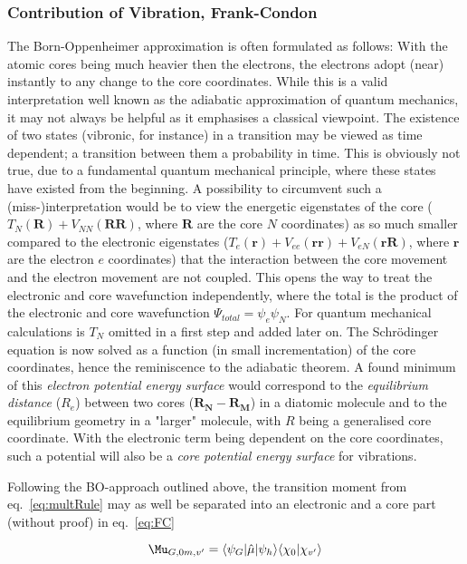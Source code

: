 			\subsubsection{Contribution of Vibration, Frank-Condon}
			The Born-Oppenheimer approximation is often formulated as follows: With the atomic cores being much heavier then the electrons, the electrons adopt (near) instantly to any change to the core coordinates. While this is a valid interpretation well known as the adiabatic approximation of quantum mechanics, it may not always be helpful as it emphasises a classical viewpoint. The existence of two states (vibronic, for instance) in a transition may be viewed as time dependent; a transition between them a probability in time. This is obviously not true, due to a fundamental quantum mechanical principle, where these states have existed from the beginning. A possibility to circumvent such a (miss-)interpretation would be to view the energetic eigenstates of the core ($T_{N}(\bm{R}) + V_{NN}(\bm{RR})$, where $\bm{R}$ are the core $N$ coordinates) as so much smaller compared to the electronic eigenstates ($T_e(\bm{r}) + V_{ee}(\bm{rr}) + V_{eN}(\bm{rR})$, where $\bm{r}$ are the electron $e$ coordinates) that the interaction between the core movement and the electron movement are not coupled. This opens the way to treat the electronic and core wavefunction independently, where the total is the product of the electronic and core wavefunction $\Psi_{total} = \psi_e\psi_N$. For quantum mechanical calculations is $T_N$ omitted in a first step and added later on. The Schrödinger equation is now solved as a function (in small incrementation) of the core coordinates, hence the reminiscence to the adiabatic theorem. A found minimum of this \emph{electron potential energy surface} would correspond to the \emph{equilibrium distance} ($R_e$) between two cores ($\bm{R_N} - \bm{R_M}$) in a diatomic molecule and to the equilibrium geometry in a "larger" molecule, with $R$ being a generalised core coordinate. With the electronic term being dependent on the core coordinates, such a potential will also be a \emph{core potential energy surface} for vibrations. 

			Following the BO-approach outlined above, the transition moment from eq.~\ref{eq:multRule} may as well be separated into an electronic and a core part (without proof) in eq.~\ref{eq:FC}

			\begin{equation}
				\label{eq:FC}
				\Mu_{G,0 m,v'} = \langle \psi_{G}|\hat{\mu}|\psi_{h} \rangle\langle\chi_0|\chi_{v'}\rangle
			\end{equation}


